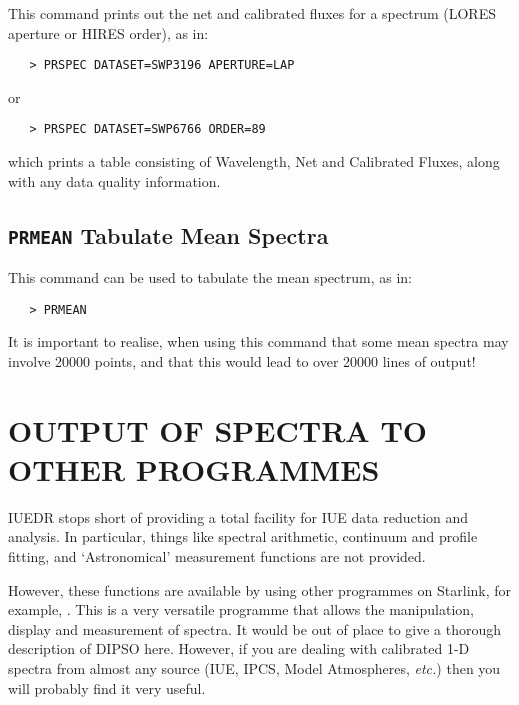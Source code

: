 This command prints out the net and calibrated fluxes for a spectrum (LORES
aperture or HIRES order), as in:

\begin{verbatim}
   > PRSPEC DATASET=SWP3196 APERTURE=LAP
\end{verbatim}

or

\begin{verbatim}
   > PRSPEC DATASET=SWP6766 ORDER=89
\end{verbatim}

which prints a table consisting of Wavelength, Net and Calibrated Fluxes,
along with any data quality information.


\subsection{{\tt PRMEAN} Tabulate Mean Spectra}

This command can be used to tabulate the mean spectrum, as in:

\begin{verbatim}
   > PRMEAN
\end{verbatim}

It is important to realise, when using this command that some mean spectra may
involve 20000 points, and that this would lead to over 20000 lines of output!


\section{\label{se:spec_output}OUTPUT OF SPECTRA TO
         OTHER PROGRAMMES}

IUEDR stops short of providing a total facility for IUE data reduction and
analysis.  In particular, things like spectral arithmetic, continuum and
profile fitting, and `Astronomical' measurement functions are not
provided.

However, these functions are available by using other programmes on Starlink,
for example, \@.
This  is a very versatile programme that allows the manipulation, display and
measurement of spectra.  It would be out of place to give a thorough
description of DIPSO here.  However, if you are dealing with calibrated 1-D
spectra from almost any source (IUE, IPCS, Model Atmospheres, {\it etc.}) 
then you will probably find it very useful.

